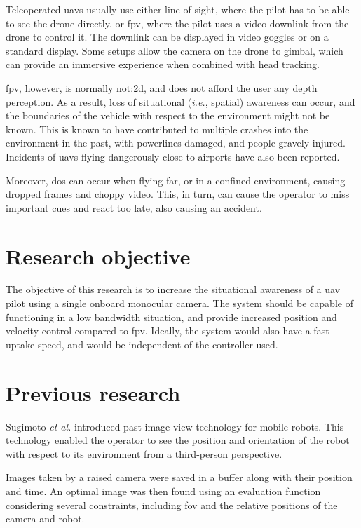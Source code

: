 Teleoperated \glspl{uav} usually use either line of sight, where the pilot has to be able to see the drone directly, or \gls{fpv}, where the pilot uses a video downlink from the drone to control it.
The downlink can be displayed in video goggles or on a standard display.
Some setups allow the camera on the drone to gimbal, which can provide an immersive experience when combined with head tracking.

\gls{fpv}, however, is normally \gls{not:2d}, and does not afford the user any depth perception.
As a result, loss of situational (\emph{i.e.}, spatial) awareness can occur, and the boundaries of the vehicle with respect to the environment might not be known.
This is known to have contributed to multiple crashes into the environment in the past, with powerlines damaged,\cite{latimes2015} and people gravely injured.\cite{seattletimes2015,bbcnews2015}
Incidents of \glspl{uav} flying dangerously close to airports have also been reported.\cite{ctvnews2014}

Moreover, \gls{dos} can occur when flying far, or in a confined environment, causing dropped frames and choppy video.
This, in turn, can cause the operator to miss important cues and react too late, also causing an accident.

\section{Research objective}
The objective of this research is to increase the situational awareness of a \gls{uav} pilot using a single onboard monocular camera.
The system should be capable of functioning in a low bandwidth situation, and provide increased position and velocity control compared to \gls{fpv}.
Ideally, the system would also have a fast uptake speed, and would be independent of the controller used.

\section{Previous research}
Sugimoto \emph{et al.} introduced past-image view technology for mobile robots.\cite{sugimoto2005}
This technology enabled the operator to see the position and orientation of the robot with respect to its environment from a third-person perspective.

Images taken by a raised camera were saved in a buffer along with their position and time.
An optimal image was then found using an evaluation function considering several constraints, including \gls{fov} and the relative positions of the camera and robot.

